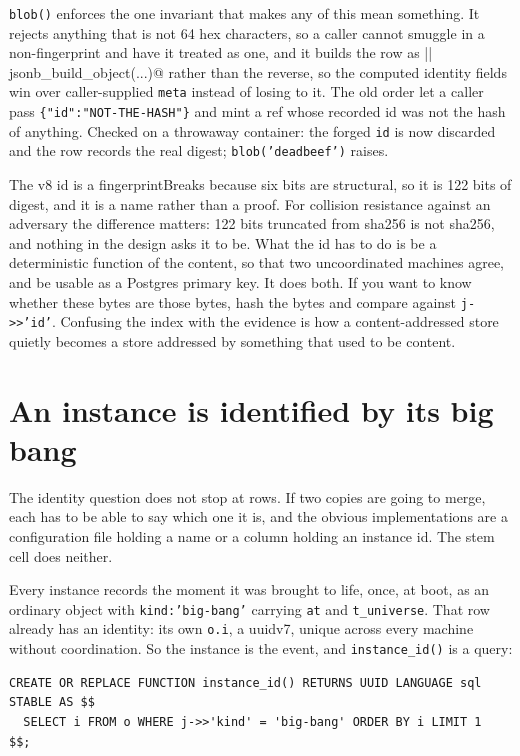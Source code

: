 \texttt{blob()} enforces the one invariant that makes any of this mean something. It rejects anything that is not 64 hex characters, so a caller cannot smuggle in a non-fingerprint and have it treated as one, and it builds the row as \verb@meta || jsonb_build_object(...)@ rather than the reverse, so the computed identity fields win over caller-supplied \texttt{meta} instead of losing to it. The old order let a caller pass \verb|{"id":"NOT-THE-HASH"}| and mint a ref whose recorded id was not the hash of anything. Checked on a throwaway container: the forged \texttt{id} is now discarded and the row records the real digest; \texttt{blob('deadbeef')} raises.

\begin{Analogy}{The v8 id is a fingerprint}{Breaks because six bits are structural, so it is 122 bits of digest, and it is a name rather than a proof.}
For collision resistance against an adversary the difference matters: 122 bits truncated from sha256 is not sha256, and nothing in the design asks it to be. What the id has to do is be a deterministic function of the content, so that two uncoordinated machines agree, and be usable as a Postgres primary key. It does both. If you want to know whether these bytes are those bytes, hash the bytes and compare against \texttt{j->>'id'}. Confusing the index with the evidence is how a content-addressed store quietly becomes a store addressed by something that used to be content.
\end{Analogy}

\section{An instance is identified by its big bang}

The identity question does not stop at rows. If two copies are going to merge, each has to be able to say which one it is, and the obvious implementations are a configuration file holding a name or a column holding an instance id. The stem cell does neither.

Every instance records the moment it was brought to life, once, at boot, as an ordinary object with \texttt{kind:'big-bang'} carrying \texttt{at} and \texttt{t\_universe}. That row already has an identity: its own \texttt{o.i}, a uuidv7, unique across every machine without coordination. So the instance is the event, and \texttt{instance\_id()} is a query:

\begin{lstlisting}
CREATE OR REPLACE FUNCTION instance_id() RETURNS UUID LANGUAGE sql STABLE AS $$
  SELECT i FROM o WHERE j->>'kind' = 'big-bang' ORDER BY i LIMIT 1
$$;
\end{lstlisting}

